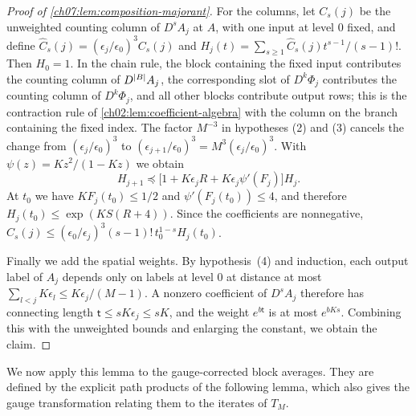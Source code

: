 \begin{proof}[Proof of \cref{ch07:lem:composition-majorant}]
For the columns, let $C_s(j)$ be the unweighted counting column of $D^sA_j$ at $A$, with one input at level $0$ fixed, and define $\widehat C_s(j)=(\epsilon_j/\epsilon_0)^3C_s(j)$ and $H_j(t)=\sum_{s\ge1}\widehat C_s(j)t^{s-1}/(s-1)!$. Then $H_0=1$. In the chain rule, the block containing the fixed input contributes the counting column of $D^{\lvert B\rvert}A_j$, the corresponding slot of $D^k\Phi_j$ contributes the counting column of $D^k\Phi_j$, and all other blocks contribute output rows; this is the contraction rule of \cref{ch02:lem:coefficient-algebra} with the column on the branch containing the fixed index. The factor $M^{-3}$ in hypotheses (2) and (3) cancels the change from $(\epsilon_j/\epsilon_0)^3$ to $(\epsilon_{j+1}/\epsilon_0)^3=M^3(\epsilon_j/\epsilon_0)^3$. With $\psi(z)=Kz^2/(1-Kz)$ we obtain
\[
 H_{j+1}\preceq\bigl[1+K\epsilon_jR+K\epsilon_j\psi'(F_j)\bigr]H_j .
\]
At $t_0$ we have $KF_j(t_0)\le1/2$ and $\psi'(F_j(t_0))\le4$, and therefore $H_j(t_0)\le\exp(KS(R+4))$. Since the coefficients are nonnegative, $C_s(j)\le(\epsilon_0/\epsilon_j)^3(s-1)!\,t_0^{1-s}H_j(t_0)$.

Finally we add the spatial weights. By hypothesis~(4) and induction, each output label of $A_j$ depends only on labels at level $0$ at distance at most $\sum_{l<j}K\epsilon_l\le K\epsilon_j/(M-1)$. A nonzero coefficient of $D^sA_j$ therefore has connecting length $\mathsf t\le sK\epsilon_j\le sK$, and the weight $e^{b\mathsf t}$ is at most $e^{bKs}$. Combining this with the unweighted bounds and enlarging the constant, we obtain the claim.
\end{proof}

We now apply this lemma to the gauge-corrected block averages. They are defined by the explicit path products of the following lemma, which also gives the gauge transformation relating them to the iterates of $T_M$.

